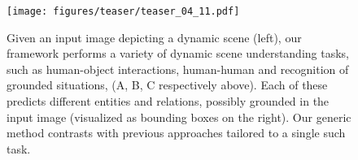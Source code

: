 \begin{figure}[t]
\center
    \texttt{[image: figures/teaser/teaser\_04\_11.pdf]}
    \caption{
    Given an input image depicting a dynamic scene (left),
    our framework performs a variety of dynamic scene understanding tasks, such as human-object interactions, human-human and recognition of grounded situations, (A, B, C respectively above). Each of these predicts different entities and relations, possibly grounded in the input image (visualized as bounding boxes on the right). Our generic method contrasts with previous approaches tailored to a single such task.
    }
    \label{fig:teaser} 
\end{figure}
